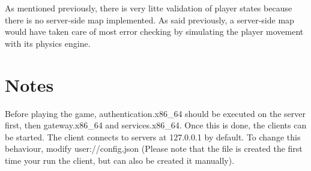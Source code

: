 \documentclass{article}
\begin{document}
As mentioned previously, there is very litte validation of player states because there is no server-side map implemented. As said previously, a server-side map would have taken care of most error checking by simulating the player movement with its physics engine.

\section{Notes}
Before playing the game, authentication.x86\_64 should be executed on the server first, then gateway.x86\_64 and services.x86\_64. Once this is done, the clients can be started. The client connects to servers at 127.0.0.1 by default. To change this behaviour, modify user://config.json (Please note that the file is created the first time your run the client, but can also be created it manually).
\end{document}
